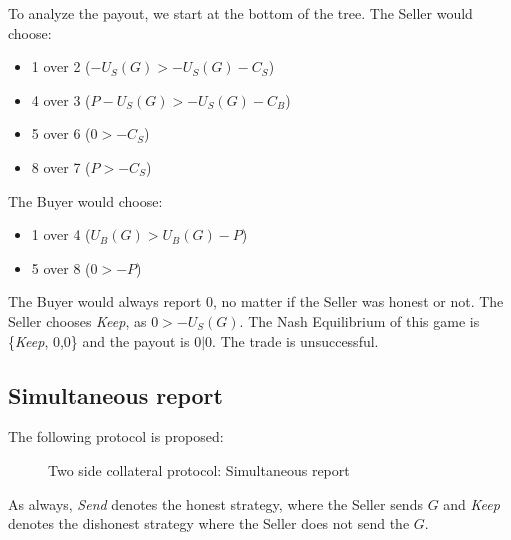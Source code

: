 \documentclass{cacthesis}
\begin{document}
To analyze the payout, we start at the bottom of the tree. The Seller would choose:
\begin{itemize}
    \item 1 over 2 ($-U_S(G) > -U_S(G) -C_S$)
    \item 4 over 3 ($P -U_S(G) > -U_S(G) -C_B$)
    \item 5 over 6 ($0 > -C_S$)
    \item 8 over 7 ($P >-C_S$)
\end{itemize}
The Buyer would choose:
\begin{itemize}
    \item 1 over 4 ($U_B(G) > U_B(G) - P$)
    \item 5 over 8 ($0 > -P$)
\end{itemize}
The Buyer would always report 0, no matter if the Seller was honest or not.
The Seller chooses \emph{Keep}, as $0>-U_S(G)$. The Nash Equilibrium of this game is \{\emph{Keep}, 0,0\} and the payout is $0|0$. The trade is unsuccessful.

\subsection{Simultaneous report}
The following protocol is proposed:
\begin{figure}[htb!]
    \centering
    \caption{Two side collateral protocol: Simultaneous report}
    \label{pro:two-side-collateral-simultaneous}
\end{figure}

As always, \emph{Send} denotes the honest strategy, where the Seller sends $G$ and \emph{Keep} denotes the dishonest strategy where the Seller does not send the $G$.
\end{document}
